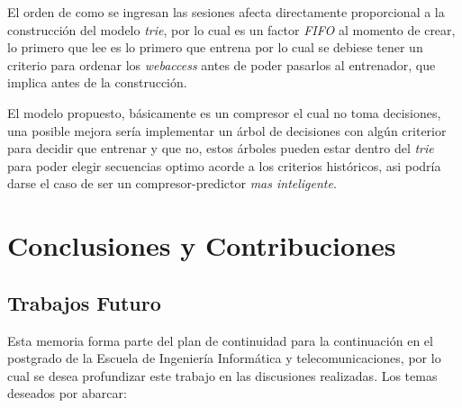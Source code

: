 



 


 


 

El orden de como se ingresan las sesiones afecta directamente proporcional a la construcción del modelo \emph{trie},  por lo cual es un factor  \emph{FIFO} al momento de crear, lo primero que lee es lo primero que entrena por lo cual se debiese tener un criterio para ordenar los \emph{webaccess} antes de poder pasarlos al entrenador, que implica antes de la construcción.

El modelo propuesto, básicamente es un compresor el cual no toma decisiones, una posible mejora sería implementar un árbol de decisiones con algún criterior para decidir que entrenar y que no, estos árboles pueden estar dentro del \emph{trie} para
poder elegir secuencias optimo acorde a los criterios históricos, asi podría darse el caso de ser un compresor-predictor  \emph{mas inteligente}.



















\vspace{2cm}
\chapter{Conclusiones y Contribuciones}\label{ch:conlusion-contrib-all}
	






\newpage
\section{Trabajos Futuro}

Esta memoria forma parte del plan de continuidad para la continuación en el postgrado de la Escuela de Ingeniería Informática y telecomunicaciones, por lo cual se desea profundizar este trabajo en las discusiones realizadas. Los temas deseados por abarcar:


